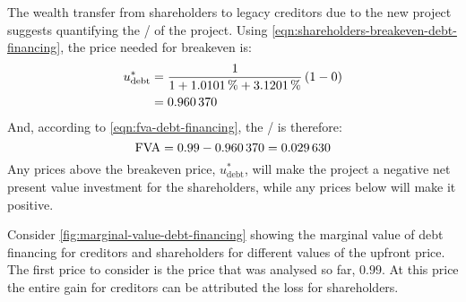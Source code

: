 \documentclass[main.tex]{subfiles}
\begin{document}
        The wealth transfer from shareholders to legacy creditors due to the new project 
        suggests quantifying the \FVA/ of the project.
        Using \cref{eqn:shareholders-breakeven-debt-financing}, the price needed for breakeven is:
            \begin{align*}
                    u^{\ast}_{\text{debt}} 
                &=
                    \frac{
                        \num{1}
                    }{
                        \num{1} + \pct{0.010101} + \pct{0.031201}
                    }
                    \left(
                        \num{1}
                        -
                        \num{0}
                    \right)
                \nonumber \\
                &=
                    \num{0.960370}
            \end{align*}
        And, according to \cref{eqn:fva-debt-financing}, the \FVA/ is therefore:
            \begin{equation*}
                    \FVA/ 
                =
                    \num{0.99} - \num{0.960370}
                =
                    \num{0.029630}
            \end{equation*}
        Any prices above the breakeven price, $u^{\ast}_{\text{debt}}$, 
        will make the project a negative net present value investment for the shareholders, while any prices below will make it positive. 
        
        Consider \cref{fig:marginal-value-debt-financing} showing the marginal value 
        of debt financing for creditors and shareholders for different values of the upfront price.
        The first price to consider is the price that was analysed so far, $\num{0.99}$.
        At this price the entire gain for creditors can be attributed the loss for shareholders.
\end{document}

